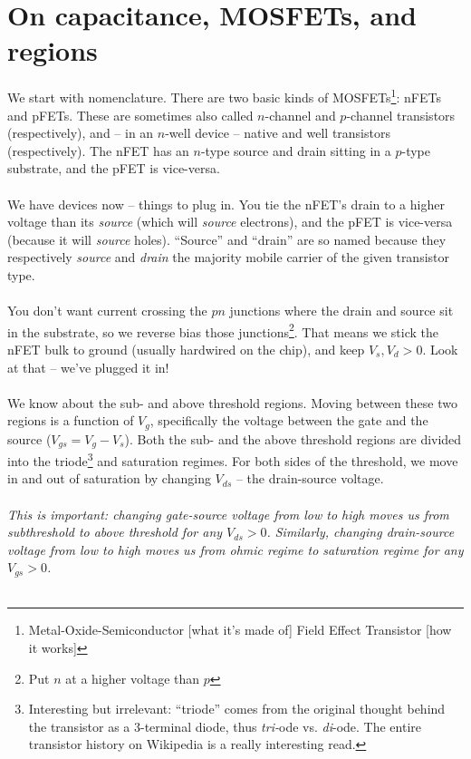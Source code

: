 


\section{On capacitance, MOSFETs, and regions}
We start with nomenclature. There are two basic kinds of MOSFETs\footnote{Metal-Oxide-Semiconductor [what it's made of] Field Effect Transistor [how it works]}: nFETs and pFETs. These are sometimes also called $n$-channel and $p$-channel transistors (respectively), and – in an $n$-well device – native and well transistors (respectively). The nFET has an $n$-type source and drain sitting in a $p$-type substrate, and the pFET is vice-versa.\\ \\
We have devices now – things to plug in. You tie the nFET's drain to a higher voltage than its \textsl{source} (which will \textsl{source} electrons), and the pFET is vice-versa (because it will \textsl{source} holes). ``Source'' and ``drain'' are so named because they respectively \textsl{source} and \textsl{drain} the majority mobile carrier of the given transistor type.\\ \\
You don't want current crossing the $pn$ junctions where the drain and source sit in the substrate, so we reverse bias those junctions\footnote{Put $n$ at a higher voltage than $p$}. That means we stick the nFET bulk to ground (usually hardwired on the chip), and keep $V_s, V_d > 0$. Look at that – we've plugged it in! \\ \\
We know about the sub- and above threshold regions. Moving between these two regions is a function of $V_g$, specifically the voltage between the gate and the source ($V_{gs} = V_g - V_s$). Both the sub- and the above threshold regions are divided into the triode\footnote{Interesting but irrelevant: ``triode'' comes from the original thought behind the transistor as a 3-terminal diode, thus \emph{tri-}ode vs. \emph{di}-ode. The entire transistor history on Wikipedia is a really interesting read.} and saturation regimes. For both sides of the threshold, we move in and out of saturation by changing $V_{ds}$ – the drain-source voltage.\\ \\
\textsl{This is important: changing \emph{gate-source} voltage from low to high moves us from subthreshold to above threshold for \emph{any} $V_{ds} > 0$. Similarly, changing \emph{drain-source} voltage from low to high moves us from ohmic regime to saturation regime for \emph{any} $V_{gs} > 0$.} \\ \\
